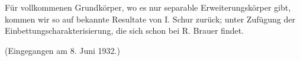 Für vollkommenen Grundkörper, wo es nur separable Erweiterungskörper gibt, kommen wir so auf bekannte Resultate von I. Schur zurück; unter Zufügung der Einbettungscharakterisierung, die sich schon bei R. Brauer findet.

\begin{center}
(Eingegangen am 8. Juni 1932.)
\end{center}

\clearpage

\setcounter{footnote}{0}

